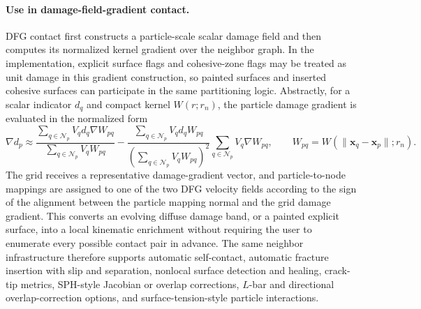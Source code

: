 \paragraph{Use in damage-field-gradient contact.}
DFG contact first constructs a particle-scale scalar damage field and then computes its normalized kernel gradient over the neighbor graph.  In the implementation, explicit surface flags and cohesive-zone flags may be treated as unit damage in this gradient construction, so painted surfaces and inserted cohesive surfaces can participate in the same partitioning logic.  Abstractly, for a scalar indicator $d_q$ and compact kernel $W(r;r_n)$, the particle damage gradient is evaluated in the normalized form
\begin{equation}
  \nabla d_p \approx
  \frac{\sum_{q\in\mathcal{N}_p} V_q d_q\nabla W_{pq}}{\sum_{q\in\mathcal{N}_p} V_q W_{pq}}
  -
  \frac{\sum_{q\in\mathcal{N}_p} V_q d_q W_{pq}}{\left(\sum_{q\in\mathcal{N}_p} V_q W_{pq}\right)^2}
  \sum_{q\in\mathcal{N}_p} V_q \nabla W_{pq},
  \qquad
  W_{pq}=W(\|\mathbf{x}_q-\mathbf{x}_p\|;r_n).
\end{equation}
The grid receives a representative damage-gradient vector, and particle-to-node mappings are assigned to one of the two DFG velocity fields according to the sign of the alignment between the particle mapping normal and the grid damage gradient.  This converts an evolving diffuse damage band, or a painted explicit surface, into a local kinematic enrichment without requiring the user to enumerate every possible contact pair in advance.  The same neighbor infrastructure therefore supports automatic self-contact, automatic fracture insertion with slip and separation, nonlocal surface detection and healing, crack-tip metrics, SPH-style Jacobian or overlap corrections, $L$-bar and directional overlap-correction options, and surface-tension-style particle interactions.

